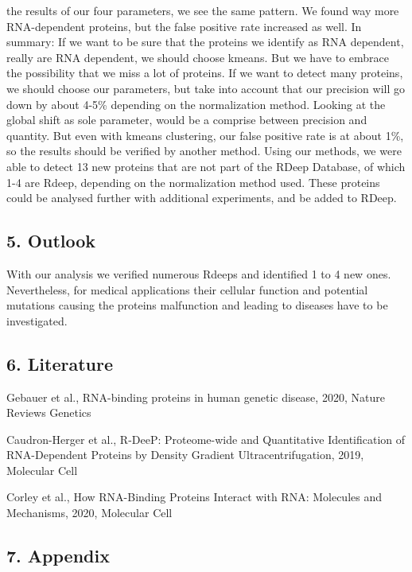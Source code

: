 \documentclass[
  12pt,
]{article}
\begin{document}
the results of our four parameters, we see the same pattern. We found
way more RNA-dependent proteins, but the false positive rate increased
as well. In summary: If we want to be sure that the proteins we identify
as RNA dependent, really are RNA dependent, we should choose kmeans. But
we have to embrace the possibility that we miss a lot of proteins. If we
want to detect many proteins, we should choose our parameters, but take
into account that our precision will go down by about 4-5\% depending on
the normalization method. Looking at the global shift as sole parameter,
would be a comprise between precision and quantity. But even with kmeans
clustering, our false positive rate is at about 1\%, so the results
should be verified by another method. Using our methods, we were able to
detect 13 new proteins that are not part of the RDeep Database, of which
1-4 are Rdeep, depending on the normalization method used. These
proteins could be analysed further with additional experiments, and be
added to RDeep.

\hypertarget{outlook}{%
\subsection{5. Outlook}\label{outlook}}

With our analysis we verified numerous Rdeeps and identified 1 to 4 new
ones. Nevertheless, for medical applications their cellular function and
potential mutations causing the proteins malfunction and leading to
diseases have to be investigated.

\hypertarget{literature}{%
\subsection{6. Literature}\label{literature}}

Gebauer et al., RNA-binding proteins in human genetic disease, 2020,
Nature Reviews Genetics

Caudron-Herger et al., R-DeeP: Proteome-wide and Quantitative
Identification of RNA-Dependent Proteins by Density Gradient
Ultracentrifugation, 2019, Molecular Cell

Corley et al., How RNA-Binding Proteins Interact with RNA: Molecules and
Mechanisms, 2020, Molecular Cell

\hypertarget{appendix}{%
\subsection{7. Appendix}\label{appendix}}
\end{document}
